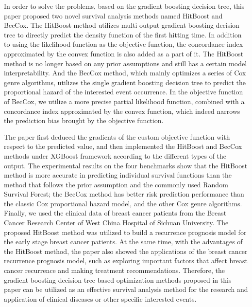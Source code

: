 \begin{englishabstract}
    In order to solve the problems, based on the gradient boosting decision tree, this paper proposed two novel survival analysis methods named HitBoost and BecCox. The HitBoost method utilizes multi output gradient boosting decision tree to directly predict the density function of the first hitting time. In addition to using the likelihood function as the objective function, the concordance index approximated by the convex function is also added as a part of it. The HitBoost method is no longer based on any prior assumptions and still has a certain model interpretability. And the BecCox method, which mainly optimizes a series of Cox genre algorithms, utilizes the single gradient boosting decision tree to predict the proportional hazard of the interested event occurrence. In the objective function of BecCox, we utilize a more precise partial likelihood function, combined with a concordance index approximated by the convex function, which indeed narrows the prediction bias brought by the objective function.

	The paper first deduced the gradients of the custom objective function with respect to the predicted value, and then implemented the HitBoost and BecCox methods under XGBoost framework according to the different types of the output. The experimental results on the four benchmarks show that the HitBoost method is more accurate in predicting individual survival functions than the method that follows the prior assumption and the commonly used Random Survival Forest; the BecCox method has better risk prediction performance than the classic Cox proportional hazard model, and the other Cox genre algorithms. Finally, we used the clinical data of breast cancer patients from the Breast Cancer Research Center of West China Hospital of Sichuan University. The proposed HitBoost method was utilized to build a recurrence prognosis model for the early stage breast cancer patients. At the same time, with the advantages of the HitBoost method, the paper also showed the applications of the breast cancer recurrence prognosis model, such as exploring important factors that affect breast cancer recurrence and making treatment recommendations. Therefore, the gradient boosting decision tree based optimization methods proposed in this paper can be utilized as an effective survival analysis method for the research and application of clinical diseases or other specific interested events.

\end{englishabstract}



